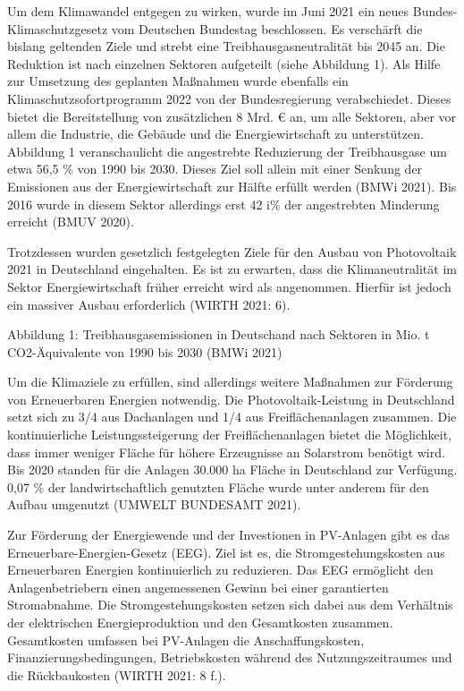 \documentclass[11pt]{scrartcl}
\begin{document}
Um dem Klimawandel entgegen zu wirken, wurde im Juni 2021 ein neues Bundes-Klimaschutzgesetz vom Deutschen Bundestag beschlossen.
Es verschärft die bislang geltenden Ziele und strebt eine Treibhausgasneutralität bis 2045 an.
Die Reduktion ist nach einzelnen Sektoren aufgeteilt (siehe Abbildung 1).
Als Hilfe zur Umsetzung des geplanten Maßnahmen wurde ebenfalls ein Klimaschutzsofortprogramm 2022 von der Bundesregierung verabschiedet.
Dieses bietet die Bereitstellung von zusätzlichen 8 Mrd. € an, um alle Sektoren, aber vor allem die Industrie, die Gebäude und die Energiewirtschaft zu unterstützen.
Abbildung 1 veranschaulicht die angestrebte Reduzierung der Treibhausgase um etwa 56,5 \% von 1990 bis 2030.
Dieses Ziel soll allein mit einer Senkung der Emissionen aus der Energiewirtschaft zur Hälfte erfüllt werden (BMWi 2021).
Bis 2016 wurde in diesem Sektor allerdings erst 42 i\% der angestrebten Minderung erreicht (BMUV 2020).

Trotzdessen wurden gesetzlich festgelegten Ziele für den Ausbau von Photovoltaik 2021 in Deutschland eingehalten. Es ist zu erwarten, dass die Klimaneutralität im Sektor Energiewirtschaft früher erreicht wird als angenommen. Hierfür ist jedoch ein massiver Ausbau erforderlich (WIRTH 2021: 6).

Abbildung 1: Treibhausgasemissionen in Deutschand nach Sektoren in Mio. t CO2-Äquivalente von 1990 bis 2030 (BMWi 2021)


Um die Klimaziele zu erfüllen, sind allerdings weitere Maßnahmen zur Förderung von Erneuerbaren Energien notwendig.
Die Photovoltaik-Leistung in Deutschland setzt sich zu 3/4 aus Dachanlagen und 1/4 aus Freiflächenanlagen zusammen.
Die kontinuierliche Leistungssteigerung der Freiflächenanlagen bietet die Möglichkeit, dass immer weniger Fläche für höhere Erzeugnisse an Solarstrom benötigt wird.
Bis 2020 standen für die Anlagen 30.000 ha Fläche in Deutschland zur Verfügung.
0,07 \% der landwirtschaftlich genutzten Fläche wurde unter anderem für den Aufbau umgenutzt (UMWELT BUNDESAMT 2021).

Zur Förderung der Energiewende und der Investionen in PV-Anlagen gibt es das Erneuerbare-Energien-Gesetz (EEG). Ziel ist es, die Stromgestehungskosten aus Erneuerbaren Energien kontinuierlich zu reduzieren. Das EEG ermöglicht den Anlagenbetriebern einen angemessenen Gewinn bei einer garantierten Stromabnahme. Die Stromgestehungskosten setzen sich dabei aus dem Verhältnis der elektrischen Energieproduktion und den Gesamtkosten zusammen. Gesamtkosten umfassen bei PV-Anlagen die Anschaffungskosten, Finanzierungsbedingungen, Betriebskosten während des Nutzungszeitraumes und die Rückbaukosten (WIRTH 2021: 8 f.).
\end{document}
